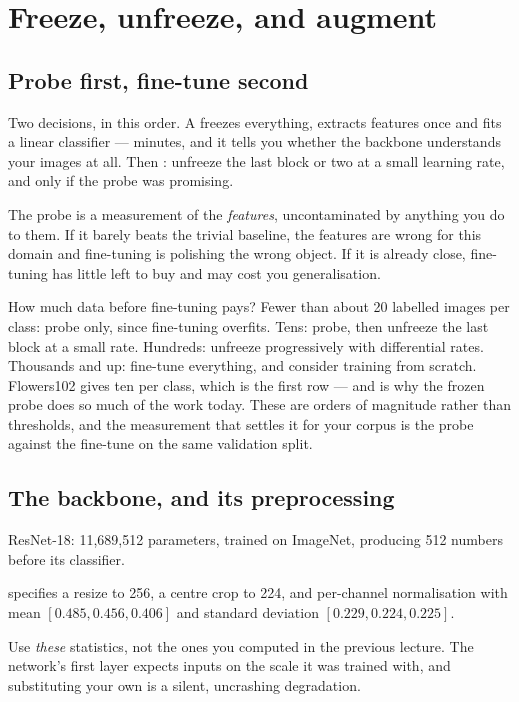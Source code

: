 \documentclass[11pt,a4paper]{article}
\begin{document}
\section{Freeze, unfreeze, and augment}

\subsection{Probe first, fine-tune second}

Two decisions, in this order. A  freezes everything,
extracts features once and fits a linear classifier --- minutes, and it tells
you whether the backbone understands your images at all. Then :
unfreeze the last block or two at a small learning rate, and only if the probe
was promising.

\begin{keybox}[title={Why the order is not arbitrary}]
The probe is a measurement of the \emph{features}, uncontaminated by anything
you do to them. If it barely beats the trivial baseline, the features are wrong
for this domain and fine-tuning is polishing the wrong object. If it is already
close, fine-tuning has little left to buy and may cost you generalisation.
\end{keybox}

How much data before fine-tuning pays? Fewer than about 20 labelled images per
class: probe only, since fine-tuning overfits. Tens: probe, then unfreeze the
last block at a small rate. Hundreds: unfreeze progressively with differential
rates. Thousands and up: fine-tune everything, and consider training from
scratch. Flowers102 gives ten per class, which is the first row --- and is why
the frozen probe does so much of the work today. These are orders of magnitude
rather than thresholds, and the measurement that settles it for your corpus is
the probe against the fine-tune on the same validation split.

\subsection{The backbone, and its preprocessing}

ResNet-18: 11{,}689{,}512 parameters, trained on ImageNet, producing 512
numbers before its classifier.

\begin{failbox}[title={Failure condition --- the weights come with their own preprocessing}]
 specifies a resize to 256, a
centre crop to 224, and per-channel normalisation with mean
$[0.485, 0.456, 0.406]$ and standard deviation $[0.229, 0.224, 0.225]$.

Use \emph{these} statistics, not the ones you computed in the previous lecture.
The network's first layer expects inputs on the scale it was trained with, and
substituting your own is a silent, uncrashing degradation.
\end{failbox}
\end{document}
